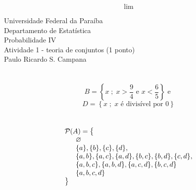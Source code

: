 \documentclass[12pt]{article}
\begin{document}
\thispagestyle{empty}

$$
\lim
$$


\begin{center}
	Universidade Federal da Paraíba \\
	Departamento de Estatística \\
	Probabilidade IV \\
	Atividade 1 - teoria de conjuntos (1 ponto) \\
	Paulo Ricardo S. Campana \\
\end{center}

\section{} \[
	B = \left\{ x \; ; \; x > \frac{9}{4} \text{ e } x < \frac{6}{5} \right\} \text{ e }
\] \[
	D = \left\{ x \; ; \; x \text{ é divisível por } 0 \right\}
\]

\section{} \[
	\begin{array}{l}
		\mathcal{P}(A) = \big\{ \\
		\hspace{+16pt} \varnothing \\
		\hspace{+16pt} \{a\}, \{b\}, \{c\}, \{d\}, \\
		\hspace{+16pt} \{a,b\}, \{a,c\}, \{a,d\}, \{b,c\}, \{b,d\}, \{c,d\}, \\
		\hspace{+16pt} \{a,b,c\}, \{a,b,d\}, \{a,c,d\}, \{b,c,d\} \\
		\hspace{+16pt} \{a,b,c,d\} \\
		\big\} \\
	\end{array}
\]
\end{document}
